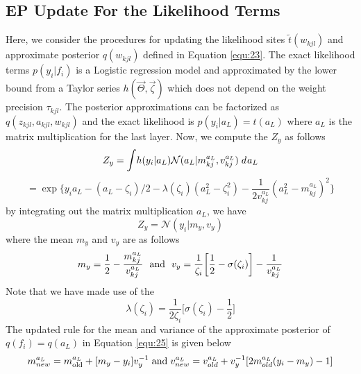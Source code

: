 \documentclass[]{article}
\begin{document}
\subsection{EP Update For the Likelihood Terms}
Here, we consider the procedures for updating the likelihood sites $\tilde{t}(w_{kjl})$ and approximate posterior $q(w_{kjl})$ defined in Equation \ref{equ:23}. The exact likelihood terms $p(y_i|f_i)$ is a Logistic regression model and approximated by the lower bound from a Taylor series $h(\vec{\Theta},\vec{\zeta})$ which does not depend on the weight precision $\tau_{kjl}$. The posterior approximations can be factorized as $q(z_{kjl},a_{kjl},w_{kjl})$ and the exact likelihood is $p(y_i|a_L) = t(a_L)$ where $a_L$ is the matrix multiplication for the last layer.
Now, we compute the $Z_y$ as follows
\begin{equation}
	Z_y = \mathlarger \int h(y_i|a_L)\mathcal{N}(a_L|m^{a_L}_{kj},v_{kj}^{a_L}) \hspace{0.04in} d \hspace{0.01in}a_L
	\label{equ:50}
\end{equation}
\begin{equation}
	= \exp\biggl\{y_ia_L-(a_L-\zeta_i)/2 - \lambda(\zeta_i)(a_L^2-\zeta_i^2) - \frac{1}{2v_{kj}^{a_L}}(a_L^2 - m_{kj}^{a_L})^2\biggr\}
	\label{equ:51}
\end{equation}
by integrating out the matrix multiplication $a_L$, we have
\begin{equation}
	Z_y = \mathcal{N}(y_i|m_y, v_y)
	\label{equ:52}
\end{equation} 
where the mean $m_y$ and $v_y$ are as follows
\begin{equation}
	m_y = \frac{1}{2} - \frac{m^{a_L}_{kj}}{v^{a_L}_{kj}} \hspace{0.09in} \text{and} \hspace{0.09in} v_y = \frac{1}{\zeta_i}\bigg[\frac{1}{2} - \sigma(\zeta_i)\bigg] - \frac{1}{v_{kj}^{a_L}}
	\label{equ:53}
\end{equation} 
Note that we have made use of the $$\lambda(\zeta_i) = \frac{1}{2\zeta_i}\bigg[\sigma(\zeta_i) - \frac{1}{2}\bigg]$$
The updated rule for the mean and variance of the approximate posterior of $q(f_i) = q(a_L)$ in Equation \ref{equ:25} is given below
\begin{equation}
	m_{new}^{a_L} = m_{\text{old}}^{a_L} + [m_y - y_i]v_y^{-1} \hspace{0.04in} \text{and} \hspace{0.04in} v_{new}^{a_L} = v_{old}^{a_L} + v_y^{-1}[2m_{old}^{a_L}(y_i-m_y)-1]
	\label{equ:54}
\end{equation}
\end{document}
